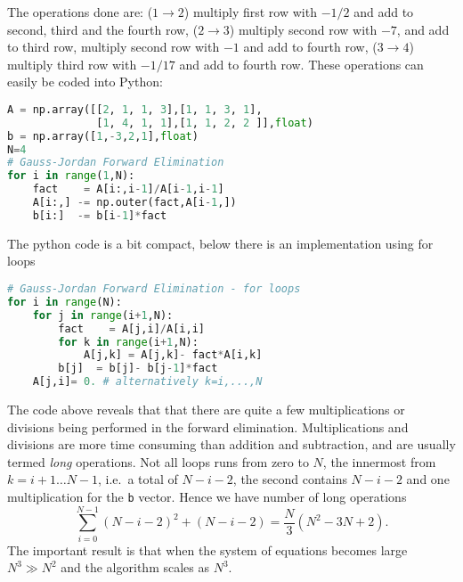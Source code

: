 \documentclass[graybox,sectrefs,envcountresetchap,open=right,final]{svmonodo}
\newenvironment{graybox2admon}[1][]{
\begin{graybox2mdframed}[frametitle=#1]
}
{
\end{graybox2mdframed}
}
\begin{document}
The operations done are: ($1\to2$) multiply first row with $-1/2$ and add to second, third and the fourth row, ($2\to 3$) multiply second row with $-7$, and add to third row, multiply second row with $-1$ and add to fourth row, ($3\to4$) multiply third row with $-1/17$ and add to fourth row. These operations can easily be coded into Python:










\begin{lstlisting}[language=python,style=blue1]
A = np.array([[2, 1, 1, 3],[1, 1, 3, 1],
              [1, 4, 1, 1],[1, 1, 2, 2 ]],float)
b = np.array([1,-3,2,1],float)
N=4
# Gauss-Jordan Forward Elimination
for i in range(1,N):
    fact    = A[i:,i-1]/A[i-1,i-1]
    A[i:,] -= np.outer(fact,A[i-1,])
    b[i:]  -= b[i-1]*fact

\end{lstlisting}

The python code is a bit compact, below there is an implementation using for loops









\begin{lstlisting}[language=python,style=blue1bar]
# Gauss-Jordan Forward Elimination - for loops
for i in range(N):
    for j in range(i+1,N):
        fact    = A[j,i]/A[i,i]
        for k in range(i+1,N):
            A[j,k] = A[j,k]- fact*A[i,k]
        b[j]  = b[j]- b[j-1]*fact
	A[j,i]= 0. # alternatively k=i,...,N

\end{lstlisting}




\begin{graybox2admon}[Number of (long) operations]
The code above reveals that that there are quite a few multiplications or divisions being performed in the forward elimination. Multiplications and divisions are more time consuming than addition and subtraction, and are usually termed \emph{long} operations. Not all loops runs from zero to $N$, the innermost from $k=i+1\ldots N-1$, i.e.~a total of $N-i-2$, the second contains $N-i-2$ and one multiplication for the \texttt{b} vector. Hence we have number of long operations
\begin{equation}
\sum_{i=0}^{N-1}(N-i-2)^2+(N-i-2)=\frac{N}{3}(N^2-3N+2).
\label{}
\end{equation}
The important result is that when the system of equations becomes large $N^3\gg N^2$ and the algorithm scales as $N^3$.
\end{graybox2admon}
\end{document}
